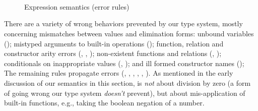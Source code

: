 \documentclass[acmsmall,screen,nonacm]{acmart}
\theoremstyle{definition}
\begin{document}
\begin{figure}[t]
  ~ \\[0.5em]

  {
  }

  ~ \\[0.5em]

  {
  }

  ~ \\[0.5em]

  {
  }

  \caption{Expression semantics (error rules)}
  \label{fig:opsem-expression-error}
\end{figure}

There are a variety of wrong behaviors prevented by our type system,
mostly concerning mismatches between values and elimination forms:
%
unbound variables ();
%
mistyped arguments to built-in operations ();
%
function, relation and constructor arity errors
(, , );
%
non-existent functions and relations
(, );
%
conditionals on inappropriate values
(, );
%
and ill formed constructor names ();
%
The remaining rules propagate errors
(, , , , , ).
%
As mentioned in the early discussion of our semantics in this
section,  is \emph{not} about division by zero
(a form of going wrong our type system \emph{doesn't} prevent), but
about mis-application of built-in functions, e.g., taking the boolean
negation of a number.
\end{document}
